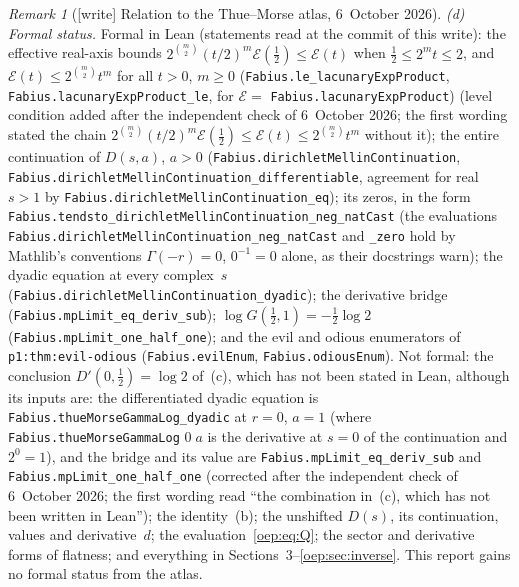 \documentclass[11pt,letterpaper]{article}
\theoremstyle{remark}\newtheorem{remark}[theorem]{Remark}
\newcommand{\file}[1]{\nolinkurl{#1}}
\begin{document}
\begin{remark}[{[write]} Relation to the Thue--Morse atlas, 6~October 2026]
{\raggedright\emph{(d) Formal status.} Formal in Lean (statements read at the commit of
this write): the effective real-axis bounds
$2^{\binom m2}(t/2)^m\mathcal E(\tfrac12)\le\mathcal E(t)$ when
$\tfrac12\le2^mt\le2$, and $\mathcal E(t)\le2^{\binom m2}t^m$ for all $t>0$,
$m\ge0$ (\file{Fabius.le_lacunaryExpProduct}, \file{Fabius.lacunaryExpProduct_le},
for $\mathcal E=$ \file{Fabius.lacunaryExpProduct}) \textup{(level condition
added after the independent check of 6~October 2026; the first wording
stated the chain
$2^{\binom m2}(t/2)^m\mathcal E(\tfrac12)\le\mathcal E(t)\le2^{\binom m2}t^m$
without it)}; the entire continuation
of $D(s,a)$, $a>0$ (\file{Fabius.dirichletMellinContinuation},
\file{Fabius.dirichletMellinContinuation_differentiable}, agreement for real
$s>1$ by \file{Fabius.dirichletMellinContinuation_eq}); its zeros, in the
form \file{Fabius.tendsto_dirichletMellinContinuation_neg_natCast} (the
evaluations \file{Fabius.dirichletMellinContinuation_neg_natCast} and
\file{_zero} hold by Mathlib's conventions $\Gamma(-r)=0$, $0^{-1}=0$ alone,
as their docstrings warn); the dyadic equation at every complex~$s$
(\file{Fabius.dirichletMellinContinuation_dyadic}); the derivative bridge
(\file{Fabius.mpLimit_eq_deriv_sub}); $\log G(\tfrac12,1)=-\tfrac12\log2$
(\file{Fabius.mpLimit_one_half_one}); and the evil and odious enumerators of
\file{p1:thm:evil-odious} (\file{Fabius.evilEnum}, \file{Fabius.odiousEnum}).
Not formal: the conclusion $D'(0,\tfrac12)=\log2$ of~(c), which has not
been stated in Lean, although its inputs are: the differentiated dyadic
equation is \file{Fabius.thueMorseGammaLog_dyadic} at $r=0$, $a=1$ (where
\file{Fabius.thueMorseGammaLog} $0\;a$ is the derivative at $s=0$ of the
continuation and $2^0=1$), and the bridge and its value are
\file{Fabius.mpLimit_eq_deriv_sub} and \file{Fabius.mpLimit_one_half_one}
\textup{(corrected after the independent check of 6~October 2026; the first
wording read ``the combination in~(c), which has not been written in
Lean'')}; the
identity~(b); the unshifted $D(s)$, its continuation, values and
derivative~$d$; the evaluation~\eqref{oep:eq:Q}; the sector and derivative
forms of flatness; and everything in
Sections~3--\ref{oep:sec:inverse}. This report gains no formal status from
the atlas.\par}
\end{remark}
\end{document}
